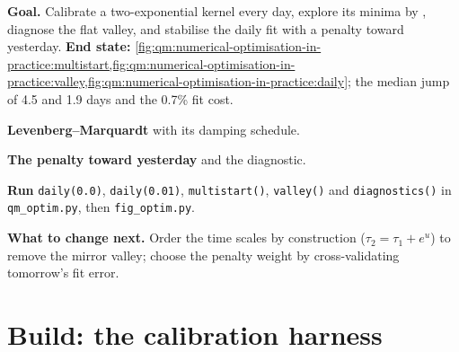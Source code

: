 \begin{tutorial}
\textbf{Goal.} Calibrate a two-exponential kernel every day, explore its minima by , diagnose the flat valley, and stabilise the daily fit with a penalty toward yesterday.
\textbf{End state:} \cref{fig:qm:numerical-optimisation-in-practice:multistart,fig:qm:numerical-optimisation-in-practice:valley,fig:qm:numerical-optimisation-in-practice:daily}; the median jump of
4.5 and 1.9 days and the 0.7\% fit cost.
\begin{tutsteps}
\item \textbf{Levenberg--Marquardt} with its damping schedule.
\label{lst:qm:numerical-optimisation-in-practice:lm}
\item \textbf{The penalty toward yesterday} and the  diagnostic.
\label{lst:qm:numerical-optimisation-in-practice:tikhonov}
\item \textbf{Run} \texttt{daily(0.0)}, \texttt{daily(0.01)}, \texttt{multistart()}, \texttt{valley()} and \texttt{diagnostics()} in \texttt{qm\_optim.py}, then \texttt{fig\_optim.py}.
\end{tutsteps}
\textbf{What to change next.} Order the time scales by construction ($\tau_2 = \tau_1 + e^u$) to remove the mirror valley; choose the penalty weight by cross-validating tomorrow's fit error.
\end{tutorial}

\section{Build: the calibration harness}\label{bld:qm:numerical-optimisation-in-practice:optim}

